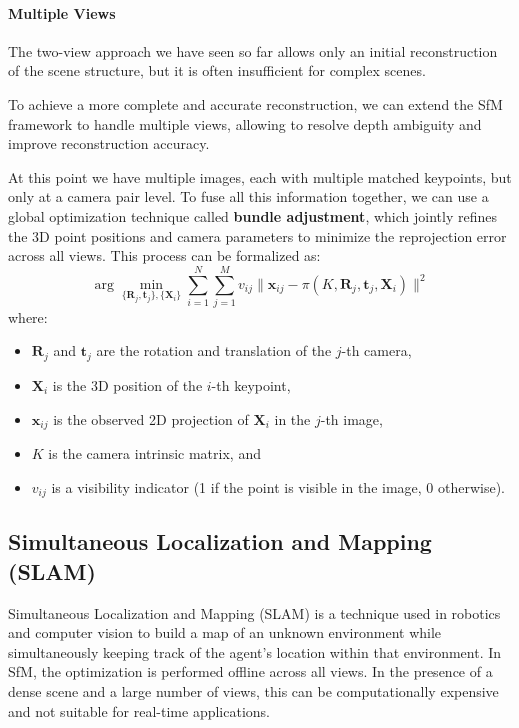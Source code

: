 \paragraph{Multiple Views}
The two-view approach we have seen so far allows only an initial reconstruction of the scene structure, 
but it is often insufficient for complex scenes.

To achieve a more complete and accurate reconstruction, we can extend the SfM framework to handle multiple views, 
allowing to resolve depth ambiguity and improve reconstruction accuracy.

At this point we have multiple images, each with multiple matched keypoints, but only at a camera pair level.
To fuse all this information together, we can use a global optimization technique called \textbf{bundle adjustment}, 
which jointly refines the 3D point positions and camera parameters to minimize the reprojection error across all views.
This process can be formalized as:
\[
    \arg\min_{\{\mathbf{R}_j, \mathbf{t}_j\}, \{\mathbf{X}_i\}}
    \sum_{i=1}^{N} \sum_{j=1}^{M} 
    v_{ij} \| \mathbf{x}_{ij} - \pi(K, \mathbf{R}_j, \mathbf{t}_j, \mathbf{X}_i) \|^2
\]
where:
\begin{itemize}
    \item $\mathbf{R}_j$ and $\mathbf{t}_j$ are the rotation and translation of the $j$-th camera,
    \item $\mathbf{X}_i$ is the 3D position of the $i$-th keypoint,
    \item $\mathbf{x}_{ij}$ is the observed 2D projection of $\mathbf{X}_i$ in the $j$-th image,
    \item $K$ is the camera intrinsic matrix, and
    \item $v_{ij}$ is a visibility indicator (1 if the point is visible in the image, 0 otherwise).
\end{itemize}

\subsection{Simultaneous Localization and Mapping (SLAM)}
Simultaneous Localization and Mapping (SLAM) is a technique used in robotics and computer vision to build a map of an unknown environment while simultaneously keeping track of the agent's location within that environment.
In SfM, the optimization is performed offline across all views. In the presence of a dense scene and a large number of views, this can be computationally expensive and not suitable for real-time applications.

